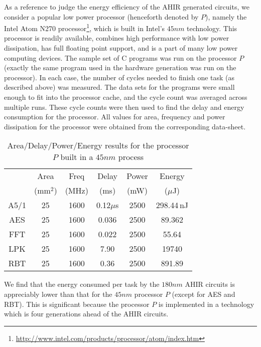 \documentclass[conference]{IEEEtran}
\begin{document}
As a reference to judge the energy efficiency of the AHIR generated
circuits, we consider a popular low power processor (henceforth
denoted by $P$), namely the Intel Atom N270
processor\footnote{\url{http://www.intel.com/products/processor/atom/index.htm}},
which is built in Intel's $45nm$ technology. This processor is readily
available, combines high performance with low power dissipation, has
full floating point support, and is a part of many low power computing
devices. The sample set of C programs was run on the processor $P$
(exactly the same program used in the hardware generation was run on
the processor). In each case, the number of cycles needed to finish
one task (as described above) was measured. The data sets for the
programs were small enough to fit into the processor cache, and the
cycle count was averaged across multiple runs. These cycle counts were
then used to find the delay and energy consumption for the processor.
All values for area, frequency and power dissipation for the processor
were obtained from the corresponding data-sheet.

\begin{table}[htb]
  \centering
  \caption{Area/Delay/Power/Energy results for the processor $P$ built in a $45nm$ process}
  \label{table:atom-power-delay}
  \renewcommand\arraystretch{1.2}
  \setlength{\tabcolsep}{1ex}
  \begin{tabular}{c|c|c|c|c|c}
    \hline
    & Area & Freq & Delay & Power & Energy \\
    & (mm$^2$) & (MHz) & (ms) & (mW) & ($\mu$J) \\
    \hline
    \hline
    A5/1 & 25 & 1600 & 0.12$\mu$s & 2500 & 298.44\,nJ  \\
    \hline
    AES & 25 & 1600 & 0.036 & 2500 & 89.362 \\
    \hline
    FFT & 25 & 1600 & 0.022 & 2500 & 55.64  \\
    \hline
    LPK & 25 & 1600 & 7.90 & 2500 & 19740  \\
    \hline
    RBT & 25 & 1600 & 0.36 & 2500 & 891.89 \\
    \hline
  \end{tabular}

\end{table}

We find that the energy consumed per task by the $180nm$ AHIR circuits
is appreciably lower than that for the $45nm$ processor $P$ (except
for AES and RBT). This is significant because the processor $P$ is
implemented in a technology which is four generations ahead of the
AHIR circuits.
\end{document}
